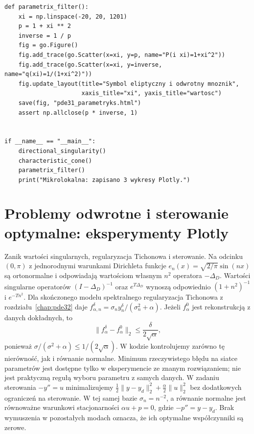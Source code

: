 \begin{lstlisting}[style=pythonpde,caption={Eksperymenty rozdziału 31 (Python i Plotly)},label={code:pde31-plotly}]
def parametrix_filter():
    xi = np.linspace(-20, 20, 1201)
    p = 1 + xi ** 2
    inverse = 1 / p
    fig = go.Figure()
    fig.add_trace(go.Scatter(x=xi, y=p, name="P(i xi)=1+xi^2"))
    fig.add_trace(go.Scatter(x=xi, y=inverse, name="q(xi)=1/(1+xi^2)"))
    fig.update_layout(title="Symbol eliptyczny i odwrotny mnoznik",
                      xaxis_title="xi", yaxis_title="wartosc")
    save(fig, "pde31_parametryks.html")
    assert np.allclose(p * inverse, 1)


if __name__ == "__main__":
    directional_singularity()
    characteristic_cone()
    parametrix_filter()
    print("Mikrolokalna: zapisano 3 wykresy Plotly.")
\end{lstlisting}


\section{Problemy odwrotne i sterowanie optymalne: eksperymenty Plotly}
\label{sec:pde32-code}
Zanik wartości singularnych, regularyzacja Tichonowa
i sterowanie. Na odcinku $(0,\pi)$ z jednorodnymi
warunkami Dirichleta funkcje
$e_n(x)=\sqrt{2/\pi}\sin(nx)$ są ortonormalne
i odpowiadają wartościom własnym $n^2$ operatora $-\Delta_D$.
Wartości singularne operatorów $(I-\Delta_D)^{-1}$
oraz $e^{T\Delta_D}$ wynoszą odpowiednio
$(1+n^2)^{-1}$ i $e^{-Tn^2}$.
Dla skończonego modelu spektralnego regularyzacja
Tichonowa z rozdziału~\ref{chap:pde32} daje
$f_{\alpha,n}^\delta=\sigma_n y_n^\delta/(\sigma_n^2+\alpha)$.
Jeżeli $f_\alpha^0$ jest rekonstrukcją z danych dokładnych,
to
\[
 \|f_\alpha^\delta-f_\alpha^0\|_2
 \le\frac{\delta}{2\sqrt\alpha},
\]
ponieważ $\sigma/(\sigma^2+\alpha)\le1/(2\sqrt\alpha)$.
W kodzie kontrolujemy zarówno tę nierówność, jak i równanie
normalne. Minimum rzeczywistego błędu na siatce parametrów
jest dostępne tylko w eksperymencie ze znanym rozwiązaniem;
nie jest praktyczną regułą wyboru parametru z samych danych.
W zadaniu sterowania $-y''=u$ minimalizujemy
$\frac12\|y-y_d\|_2^2+\frac\alpha2\|u\|_2^2$
bez dodatkowych ograniczeń na sterowanie.
W tej samej bazie $\sigma_n=n^{-2}$, a równanie normalne
jest równoważne warunkowi stacjonarności
$\alpha u+p=0$, gdzie $-p''=y-y_d$.
Brak wymuszenia w pozostałych modach oznacza, że ich
optymalne współczynniki są zerowe.
